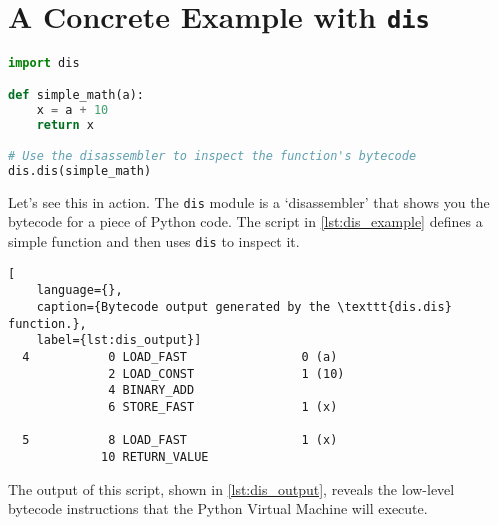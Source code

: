 
\lstset{style=estilo}

\section*{A Concrete Example with \texttt{dis}}

\begin{lstlisting}[language=Python, caption={Python code demonstrating the \texttt{dis} module.}, label={lst:dis_example}
]
import dis

def simple_math(a):
    x = a + 10
    return x

# Use the disassembler to inspect the function's bytecode
dis.dis(simple_math)
\end{lstlisting}

Let's see this in action. The \texttt{dis} module is a `disassembler' that 
shows you the bytecode for a piece of Python code. The script in \autoref{lst:dis_example} defines a simple function and then uses \texttt{dis} to inspect it.

\begin{lstlisting}[
    language={}, 
    caption={Bytecode output generated by the \texttt{dis.dis} function.},
    label={lst:dis_output}]
  4           0 LOAD_FAST                0 (a)
              2 LOAD_CONST               1 (10)
              4 BINARY_ADD
              6 STORE_FAST               1 (x)

  5           8 LOAD_FAST                1 (x)
             10 RETURN_VALUE
\end{lstlisting}

The output of this script, shown in \autoref{lst:dis_output}, reveals the low-level bytecode instructions that the Python Virtual Machine will execute.

